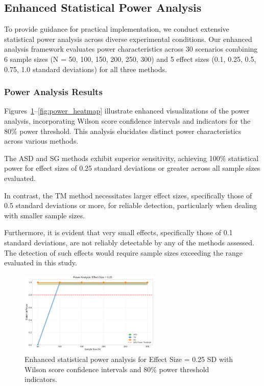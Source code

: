 \documentclass[final,3p,fleqn, 10pt]{elsarticle}
\begin{document}
\subsection{Enhanced Statistical Power Analysis}
\label{sec:enhanced_power_analysis}

To provide guidance for practical implementation, we conduct extensive statistical power analysis across diverse experimental conditions. Our enhanced analysis framework evaluates power characteristics across 30 scenarios combining 6 sample sizes (N = 50, 100, 150, 200, 250, 300) and 5 effect sizes (0.1, 0.25, 0.5, 0.75, 1.0 standard deviations) for all three methods.

\subsubsection{Power Analysis Results}

Figures~\ref{fig:power_curve_0p25}--\ref{fig:power_heatmap} illustrate enhanced visualizations of the power analysis, incorporating Wilson score confidence intervals and indicators for the 80\% power threshold. This analysis elucidates distinct power characteristics across various methods.

The ASD and SG methods exhibit superior sensitivity, achieving 100\% statistical power for effect sizes of 0.25 standard deviations or greater across all sample sizes evaluated.

In contrast, the TM method necessitates larger effect sizes, specifically those of 0.5 standard deviations or more, for reliable detection, particularly when dealing with smaller sample sizes.

Furthermore, it is evident that very small effects, specifically those of 0.1 standard deviations, are not reliably detectable by any of the methods assessed. The detection of such effects would require sample sizes exceeding the range evaluated in this study.

\begin{figure}[htb!]
    \centering
    \includegraphics[width=0.6\textwidth]{stage4_enhanced_visualizations/power_enhanced/power_curve_enhanced_es_0p25.png}
    \caption{Enhanced statistical power analysis for Effect Size = 0.25 SD with Wilson score confidence intervals and 80\% power threshold indicators.}
    \label{fig:power_curve_0p25}
\end{figure}
\end{document}
